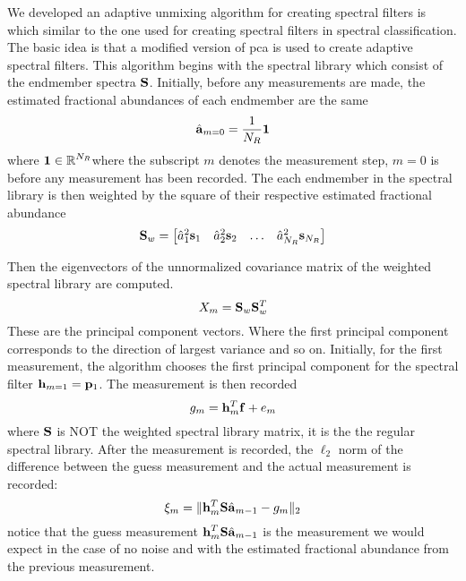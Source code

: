 We developed an adaptive unmixing algorithm for creating spectral filters is which similar to the one used for creating spectral filters in spectral classification. The basic idea is that a modified version of \gls{pca} is used to create adaptive spectral filters. This algorithm begins with the spectral library which consist of the endmember spectra $\displaystyle \mathbf{S}$. Initially, before any measurements are made, the estimated fractional abundances of each endmember are the same 
%
\begin{equation}
	\hat{ \displaystyle \mathbf{a} }_{m=0} = \frac{1}{N_R} \displaystyle \mathbf{1}
\end{equation}
%
where $\displaystyle \mathbf{1} \in \mathbb{R}^{N_R}$where the subscript $m$ denotes the measurement step, $m=0$ is before any measurement has been recorded. The each endmember in the spectral library is then weighted by the square of their respective estimated fractional abundance
%
\begin{equation}
	\displaystyle \mathbf{S}_w = 
	\begin{bmatrix}
		\hat{a}_1^2 \displaystyle \mathbf{s}_1 & \hat{a}_2^2 \displaystyle \mathbf{s}_2 & \hdots & \hat{a}_{N_R}^2 \displaystyle \mathbf{s}_{N_R}
	\end{bmatrix}
	\label{eq:weightedSpectralLibrary}
\end{equation}

Then the eigenvectors of the unnormalized covariance matrix of the weighted spectral library are computed. 
%
\begin{equation}
	X_m = \displaystyle \mathbf{S}_w \displaystyle \mathbf{S}_w^T 
\end{equation}
%
These are the principal component vectors. Where the first principal component corresponds to the direction of largest variance and so on. Initially, for the first measurement, the algorithm chooses the first principal component for the spectral filter $\displaystyle \mathbf{h}_{m=1} = \displaystyle \mathbf{p}_1$. The measurement is then recorded
%
\begin{equation}
g_m = \displaystyle \mathbf{h}_{m}^{T} \displaystyle \mathbf{f} + e_m
\end{equation}
%
where $\displaystyle \mathbf{S}$ is NOT the weighted spectral library matrix, it is the the regular spectral library. After the measurement is recorded, the $\ell_2$ norm of the difference between the guess measurement and the actual measurement is recorded:
%
\begin{equation}
	\xi_m = \| \displaystyle \mathbf{h}_{m}^{T} \displaystyle \mathbf{S} \hat{ \displaystyle \mathbf{a} }_{m-1} - g_m \|_2 
\end{equation}
%
notice that the guess measurement $\displaystyle \mathbf{h}_{m}^{T} \displaystyle \mathbf{S} \hat{ \displaystyle \mathbf{a} }_{m-1}$ is the measurement we would expect in the case of no noise and with the estimated fractional abundance from the previous measurement. 

